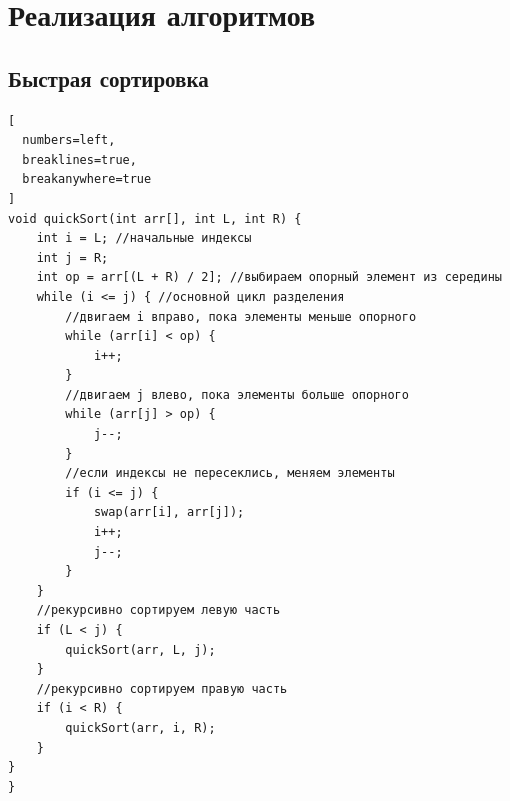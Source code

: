 \documentclass[otchet]{SCWorks}
\begin{document}

\date{2026}

\maketitle

\secNumbering

\tableofcontents




\section{Реализация алгоритмов}
\subsection{Быстрая сортировка}
\begin{Verbatim}[
  numbers=left,
  breaklines=true,
  breakanywhere=true
]
void quickSort(int arr[], int L, int R) {
    int i = L; //начальные индексы
    int j = R;
    int op = arr[(L + R) / 2]; //выбираем опорный элемент из середины
    while (i <= j) { //основной цикл разделения
        //двигаем i вправо, пока элементы меньше опорного
        while (arr[i] < op) {
            i++;
        }
        //двигаем j влево, пока элементы больше опорного
        while (arr[j] > op) {
            j--;
        }
        //если индексы не пересеклись, меняем элементы
        if (i <= j) {
            swap(arr[i], arr[j]);
            i++;
            j--;
        }
    }
    //рекурсивно сортируем левую часть
    if (L < j) {
        quickSort(arr, L, j);
    }
    //рекурсивно сортируем правую часть
    if (i < R) {
        quickSort(arr, i, R);
    }
}
}
\end{Verbatim}
\end{document}
